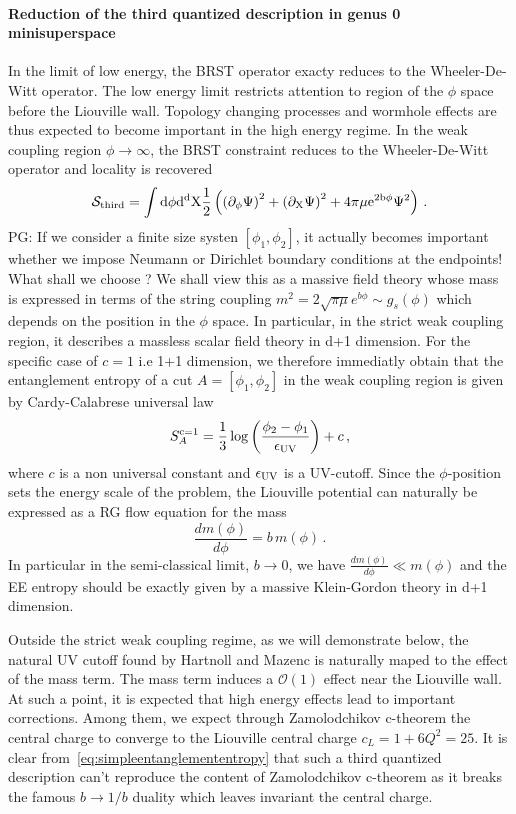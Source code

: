\documentclass[a4paper]{article}
\newcommand{\purple}[1]{{\color{purple} #1 \color{black}}}
\newcommand{\PG}[1]{{\purple{PG: #1}}} %
\begin{document}
\paragraph{Reduction of the third quantized description in genus 0 minisuperspace}
In the limit of low energy, the BRST operator exacty reduces to the Wheeler-De-Witt operator. The low energy limit restricts attention to region of the $\phi$ space before the Liouville wall. Topology changing processes and wormhole effects are thus expected to become important in the high energy regime. In the weak coupling region $\phi\to\infty$, the BRST constraint reduces to the Wheeler-De-Witt operator and locality is recovered
\begin{equation}\label{eq:simpleentanglemententropy}
  \mathcal{S}_{\rm third} = \int \rm{d}\phi \rm{d}^d X \frac{1}{2}\left(\left(\partial_\phi \Psi\right)^2+ \left(\partial_X \Psi\right)^2+4\pi \mu e^{2b\phi}\Psi^2\right)\,.
\end{equation}
\PG{If we consider a finite size systen $[\phi_1,\phi_2]$, it actually becomes important whether we impose Neumann or Dirichlet boundary conditions at the endpoints! What shall we choose ?}
We shall view this as a massive field theory whose mass is expressed in terms of the string coupling $m^2 = 2\sqrt{\pi \mu}e^{b\phi} \sim g_s(\phi)$ which depends on the position in the $\phi$ space. In particular, in the strict weak coupling region, it describes a massless scalar field theory in d+1 dimension. For the specific case of $c=1$ i.e 1+1 dimension, we therefore immediatly obtain that the entanglement entropy of a cut $A=[\phi_1,\phi_2]$ in the weak coupling region is given by Cardy-Calabrese universal law
\begin{equation}
  S^{\rm c=1}_A = \frac{1}{3}\log\left(\frac{\phi_2-\phi_1}{\epsilon_{\rm UV}}\right)+c\,,
\end{equation}
where $c$ is a non universal constant and $\epsilon_{\rm UV}$ is a UV-cutoff. Since the $\phi$-position sets the energy scale of the problem, the Liouville potential can naturally be expressed as a RG flow equation for the mass
\begin{equation}
  \frac{d m(\phi)}{d\phi} = b\, m(\phi)\,.
\end{equation}
In particular in the semi-classical limit, $b\to 0$, we have $\frac{d m(\phi)}{d\phi}\ll m(\phi)$ and the EE entropy should be exactly given by a massive Klein-Gordon theory in d+1 dimension.

Outside the strict weak coupling regime, as we will demonstrate below, the natural UV cutoff found by Hartnoll and Mazenc is naturally maped to the effect of the mass term. The mass term induces a $\mathcal{O}(1)$ effect near the Liouville wall. At such a point, it is expected that high energy effects lead to important corrections. Among them, we expect through Zamolodchikov c-theorem the central charge to converge to the Liouville central charge $c_L = 1 +6Q^2 = 25$. It is clear from~\eqref{eq:simpleentanglemententropy} that such a third quantized description can't reproduce the content of Zamolodchikov c-theorem as it breaks the famous $b\to 1/b$ duality which leaves invariant the central charge.
\end{document}
